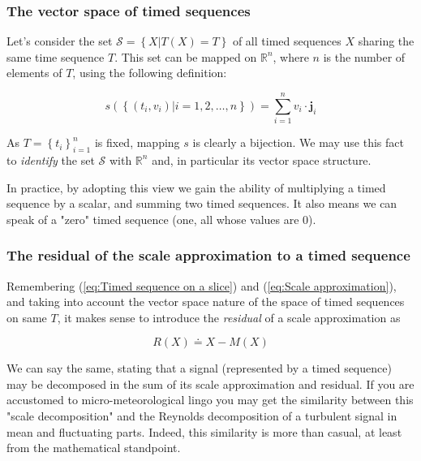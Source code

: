 \documentclass[a4paper,10pt]{book}
\begin{document}
\subsubsection{The vector space of timed sequences}

Let's consider the set $\mathcal{S} = \left\{ X \left| T(X)=T \right.\right\}$ of all timed sequences $X$ sharing the same time sequence $T$. This set can be mapped on $\mathbb{R}^{n}$, where $n$ is the number of elements of $T$, using the following definition:

\begin{equation}\label{eq:Standard mapping of timed sequences with same T}
	s(\left\{(t_{i},v_{i}) \left| i=1, 2, \ldots, n\right.\right\}) = \sum_{i=1}^{n} v_{i} \cdot \mathbf{j}_{i}
\end{equation}

As $T = \left\{t_{i}\right\}_{i=1}^{n}$ is fixed, mapping $s$ is clearly a bijection. We may use this fact to \emph{identify} the set $\mathcal{S}$ with $\mathbb{R}^{n}$ and, in particular its vector space structure.

In practice, by adopting this view we gain the ability of multiplying a timed sequence by a scalar, and summing two timed sequences. It also means we can speak of a "zero" timed sequence (one, all whose values are 0).


\subsubsection{The residual of the scale approximation to a timed sequence}

Remembering (\ref{eq:Timed sequence on a slice}) and (\ref{eq:Scale approximation}), and taking into account the vector space nature of the space of timed sequences on same $T$, it makes sense to introduce the \emph{residual} of a scale approximation as

\begin{equation}\label{eq:Residual}
	R(X) \doteq X - M(X)
\end{equation}

We can say the same, stating that a signal (represented by a timed sequence) may be decomposed in the sum of its scale approximation and residual. If you are accustomed to micro-meteorological lingo you may get the similarity between this "scale decomposition" and the Reynolds decomposition of a turbulent signal in mean and fluctuating parts. Indeed, this similarity is more than casual, at least from the mathematical standpoint.
\end{document}
